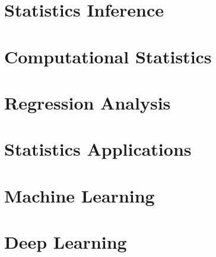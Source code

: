 \documentclass[12pt]{prettybook}
\begin{document}
\part{Statistics Inference}







\part{Computational Statistics}



\part{Regression Analysis}






\part{Statistics Applications}




\part{Machine Learning}





\part{Deep Learning}

\appendix

\backmatter
\printbibliography
\end{document}
